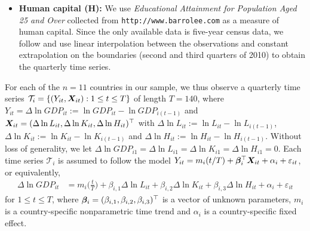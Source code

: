\documentclass[12pt]{article}
\begin{document}
\begin{itemize}[leftmargin=0.5cm, itemsep=0pt, parsep=0pt, topsep=3pt]
\item \textbf{Human capital ($\boldsymbol{H}$):} We use \textit{Educational Attainment for Population Aged 25 and Over} collected from \texttt{http://www.barrolee.com} as a measure of human capital. Since the only available data is five-year census data, we follow \cite{Zhang2012} and use linear interpolation between the observations and constant extrapolation on the boundaries (second and third quarters of 2010) to obtain the quarterly time series.
\end{itemize}


For each of the $n=11$ countries in our sample, we thus observe a quarterly time series $\mathcal{T}_i = \{(Y_{it}, \boldsymbol{X}_{it}): 1 \le t \le T \}$ of length $T = 140$, where $Y_{it} = \Delta \ln GDP_{it} := \ln GDP_{it} - \ln GDP_{i(t-1)}$ and $\boldsymbol{X}_{it} = (\Delta \ln L_{it}, \Delta \ln K_{it}, \Delta \ln H_{it})^\top$ with $\Delta \ln L_{it} := \ln L_{it} - \ln L_{i(t-1)}$, $\Delta \ln K_{it} := \ln K_{it} - \ln K_{i(t-1)}$ and $\Delta \ln H_{it} := \ln H_{it} - \ln H_{i(t-1)}$. Without loss of generality, we let $\Delta \ln GDP_{i1} = \Delta \ln L_{i1} = \Delta \ln K_{i1} = \Delta \ln H_{i1} = 0$. Each time series $\mathcal{T}_i$ is assumed to follow the model $Y_{it} = m_i(t/T) + \bm{\beta}^\top_i \boldsymbol{X}_{it} + \alpha_i + \varepsilon_{it}$, or equivalently,  
\begin{align}
\Delta \ln GDP_{it}
 & = m_i \Big( \frac{t}{T} \Big) + \beta_{i, 1} \Delta \ln L_{it} + \beta_{i, 2} \Delta \ln K_{it} + \beta_{i, 3} \Delta \ln H_{it} + \alpha_i + \varepsilon_{it} \label{eq:model:app}
\end{align}
for $1 \le t \le T$, where $\bm{\beta}_i = (\beta_{i, 1}, \beta_{i, 2}, \beta_{i, 3})^\top$ is a vector of unknown parameters, $m_i$ is a country-specific nonparametric time trend and $\alpha_i$ is a country-specific fixed effect. 
\end{document}
